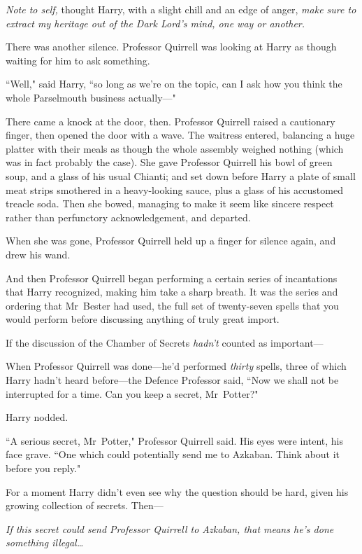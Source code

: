 \emph{Note to self,} thought Harry, with a slight chill and an edge of anger, \emph{make sure to extract my heritage out of the Dark Lord's mind, one way or another.}

There was another silence. Professor Quirrell was looking at Harry as though waiting for him to ask something.

``Well," said Harry, ``so long as we're on the topic, can I ask how you think the whole Parselmouth business actually—"

There came a knock at the door, then. Professor Quirrell raised a cautionary finger, then opened the door with a wave. The waitress entered, balancing a huge platter with their meals as though the whole assembly weighed nothing (which was in fact probably the case). She gave Professor Quirrell his bowl of green soup, and a glass of his usual Chianti; and set down before Harry a plate of small meat strips smothered in a heavy-looking sauce, plus a glass of his accustomed treacle soda. Then she bowed, managing to make it seem like sincere respect rather than perfunctory acknowledgement, and departed.

When she was gone, Professor Quirrell held up a finger for silence again, and drew his wand.

And then Professor Quirrell began performing a certain series of incantations that Harry recognized, making him take a sharp breath. It was the series and ordering that Mr~Bester had used, the full set of twenty-seven spells that you would perform before discussing anything of truly great import.

If the discussion of the Chamber of Secrets \emph{hadn't} counted as important—

When Professor Quirrell was done—he'd performed \emph{thirty} spells, three of which Harry hadn't heard before—the Defence Professor said, ``Now we shall not be interrupted for a time. Can you keep a secret, Mr~Potter?"

Harry nodded.

``A serious secret, Mr~Potter," Professor Quirrell said. His eyes were intent, his face grave. ``One which could potentially send me to Azkaban. Think about it before you reply."

For a moment Harry didn't even see why the question should be hard, given his growing collection of secrets. Then—

\emph{If this secret could send Professor Quirrell to Azkaban, that means he's done something illegal{\ldots}}


